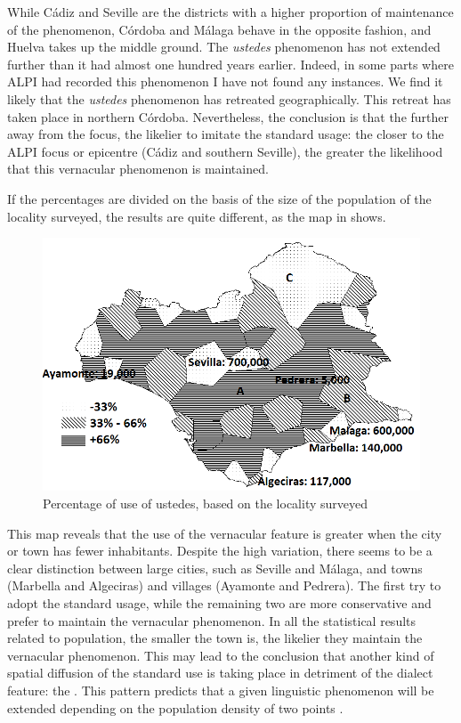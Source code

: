 \documentclass[output=paper]{LSP/langsci}
\begin{document}
While Cádiz and Seville are the districts with a higher proportion of maintenance of the phenomenon, Córdoba and Málaga behave in the opposite fashion, and Huelva takes up the middle ground. The \textit{ustedes} phenomenon has not extended further than it had almost one hundred years earlier. Indeed, in some parts where ALPI had recorded this phenomenon I have not found any instances. We find it likely that the \textit{ustedes} phenomenon has retreated geographically. This retreat has taken place in northern Córdoba. Nevertheless, the conclusion is that the further away from the focus, the likelier to imitate the standard usage: the closer to the ALPI focus or epicentre (Cádiz and southern Seville), the greater the likelihood that this vernacular phenomenon is maintained. 

If the percentages are divided on the basis of the size of the population of the locality surveyed, the results are quite different, as the map in  shows.

\begin{figure}
\includegraphics[width=.95\textwidth]{illustrations/lara_fig4}
\caption{Percentage of use of ustedes, based on the locality surveyed}
\label{fig:lara:4}
\end{figure}
  
This map reveals that the use of the vernacular feature is greater when the city or town has fewer inhabitants. Despite the high variation, there seems to be a clear distinction between large cities, such as Seville and Málaga, and towns (Marbella and Algeciras) and villages (Ayamonte and Pedrera). The first try to adopt the standard usage, while the remaining two are more conservative and prefer to maintain the vernacular phenomenon. In all the statistical results related to population, the smaller the town is, the likelier they maintain the vernacular phenomenon. This may lead to the conclusion that another kind of spatial diffusion of the standard use is taking place in detriment of the dialect feature: the . This pattern predicts that a given linguistic phenomenon will be extended depending on the population density of two points \citep{wolfram_dialectology_2003}.
 
\end{document}
